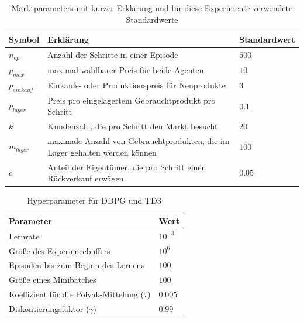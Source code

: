 \begin{table}[htb]
	\centering
	\begin{tabular}{p{} p{} p{}}
		\toprule
		Symbol        & Erklärung                                                                   & Standardwert\\\midrule
		$n_{ep}$      & Anzahl der Schritte in einer Episode                                        & $500$\\
		$p_{max}$     & maximal wählbarer Preis für beide Agenten                                   & $10$\\
		$p_{einkauf}$ & Einkaufs- oder Produktionspreis für Neuprodukte                             & $3$\\
		$p_{lager}$   & Preis pro eingelagertem Gebrauchtprodukt pro Schritt                        & $0.1$\\
		$k$           & Kundenzahl, die pro Schritt den Markt besucht                               & $20$\\
		$m_{lager}$   & maximale Anzahl von Gebrauchtprodukten, die im Lager gehalten werden können & $100$\\
		$c$           & Anteil der Eigentümer, die pro Schritt einen Rückverkauf erwägen            & $0.05$\\\bottomrule
	\end{tabular}
	\caption{Marktparameters mit kurzer Erklärung und für diese Experimente verwendete Standardwerte}
	\label{tab:default_parameters}
\end{table}

\begin{table}[htb]
	\centering
	\begin{tabular}{p{} p{}}
		\toprule
		Parameter                                     & Wert\\\midrule
		Lernrate                                      & $10^{-3}$\\
		Größe des Experiencebuffers                   & $10^6$\\
		Episoden bis zum Beginn des Lernens           & $100$\\
		Größe eines Minibatches                       & $100$\\
		Koeffizient für die Polyak-Mittelung ($\tau$) & $0.005$\\
		Diskontierungsfaktor ($\gamma$)               & $0.99$\\\bottomrule
	\end{tabular}
	\caption{Hyperparameter für DDPG und TD3}
	\label{tab:DDPGHyperparameters}
\end{table}

